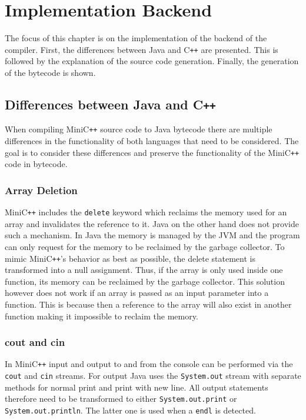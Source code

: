 \chapter{Implementation Backend}

The focus of this chapter is on the implementation of the backend of the compiler. First, the differences between Java and C\verb|++| are presented. This is followed by the explanation of the source code generation. Finally, the generation of the bytecode is shown.

\section{Differences between Java and C\texttt{++}}

When compiling MiniC\verb|++| source code to Java bytecode there are multiple differences in the functionality of both languages that need to be considered. The goal is to consider these differences and preserve the functionality of the MiniC\verb|++| code in bytecode. 

\subsection{Array Deletion}

MiniC\verb|++| includes the \verb|delete| keyword which reclaims the memory used for an array and invalidates the reference to it. Java on the other hand does not provide such a mechanism. In Java the memory is managed by the JVM and the program can only request for the memory to be reclaimed by the garbage collector. To mimic MiniC\verb|++|'s behavior as best as possible, the delete statement is transformed into a null assignment. Thus, if the array is only used inside one function, its memory can be reclaimed by the garbage collector. This solution however does not work if an array is passed as an input parameter into a function. This is because then a reference to the array will also exist in another function making it impossible to reclaim the memory.  

\subsection{cout and cin}

In MiniC\verb|++| input and output to and from the console can be performed via the \verb|cout| and \verb|cin| streams. For output Java uses the \verb|System.out| stream with separate methods for normal print and print with new line. All output statements therefore need to be transformed to either \verb|System.out.print| or \verb|System.out.println|. The latter one is used when a \verb|endl| is detected. 

